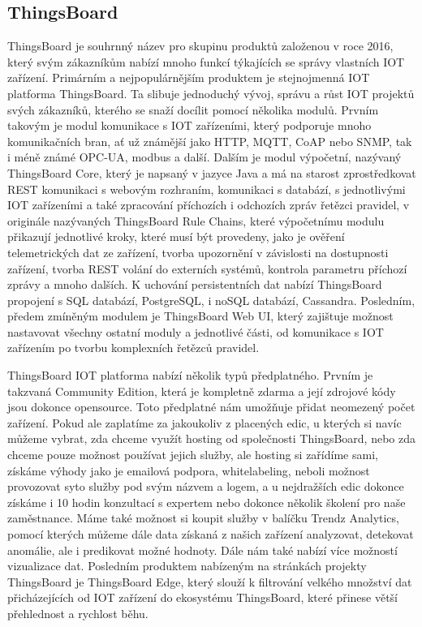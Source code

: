 \subsection{ThingsBoard}

ThingsBoard je souhrnný název pro skupinu produktů založenou v roce 2016, který svým zákazníkům nabízí mnoho funkcí týkajících se správy vlastních IOT zařízení. Primárním a nejpopulárnějším produktem je stejnojmenná IOT platforma ThingsBoard. Ta slibuje jednoduchý vývoj, správu a růst IOT projektů svých zákazníků, kterého se snaží docílit pomocí několika modulů. Prvním takovým je modul komunikace s IOT zařízeními, který podporuje mnoho komunikačních bran, ať už známější jako HTTP, MQTT, CoAP nebo SNMP, tak i méně známé OPC-UA, modbus a další. Dalším je modul výpočetní, nazývaný ThingsBoard Core, který je napsaný v jazyce Java a má na starost zprostředkovat REST komunikaci s webovým rozhraním, komunikaci s databází, s jednotlivými IOT zařízeními a také zpracování příchozích i odchozích zpráv řetězci pravidel, v originále nazývaných ThingsBoard Rule Chains, které výpočetnímu modulu přikazují jednotlivé kroky, které musí být provedeny, jako je ověření telemetrických dat ze zařízení, tvorba upozornění v závislosti na dostupnosti zařízení, tvorba REST volání do externích systémů, kontrola parametru příchozí zprávy a mnoho dalších. K uchování persistentních dat nabízí ThingsBoard propojení s SQL databází, PostgreSQL, i noSQL databází, Cassandra. Posledním, předem zmíněným modulem je ThingsBoard Web UI, který zajištuje možnost nastavovat všechny ostatní moduly a jednotlivé části, od komunikace s IOT zařízením po tvorbu komplexních řetězců pravidel.

ThingsBoard IOT platforma nabízí několik typů předplatného. Prvním je takzvaná Community Edition, která je kompletně zdarma a její zdrojové kódy jsou dokonce opensource. Toto předplatné nám umožňuje přidat neomezený počet zařízení. Pokud ale zaplatíme za jakoukoliv z placených edic, u kterých si navíc můžeme vybrat, zda chceme využít hosting od společnosti ThingsBoard, nebo zda chceme pouze možnost používat jejich služby, ale hosting si zařídíme sami, získáme výhody jako je emailová podpora, whitelabeling, neboli možnost provozovat syto služby pod svým názvem a logem, a u nejdražších edic dokonce získáme i 10 hodin konzultací s expertem nebo dokonce několik školení pro naše zaměstnance. Máme také možnost si koupit služby v balíčku Trendz Analytics, pomocí kterých můžeme dále data získaná z našich zařízení analyzovat, detekovat anomálie, ale i predikovat možné hodnoty. Dále nám také nabízí více možností vizualizace dat. Posledním produktem nabízeným na stránkách projekty ThingsBoard je ThingsBoard Edge, který slouží k filtrování velkého množství dat přicházejících od IOT zařízení do ekosystému ThingsBoard, které přinese větší přehlednost a rychlost běhu.

